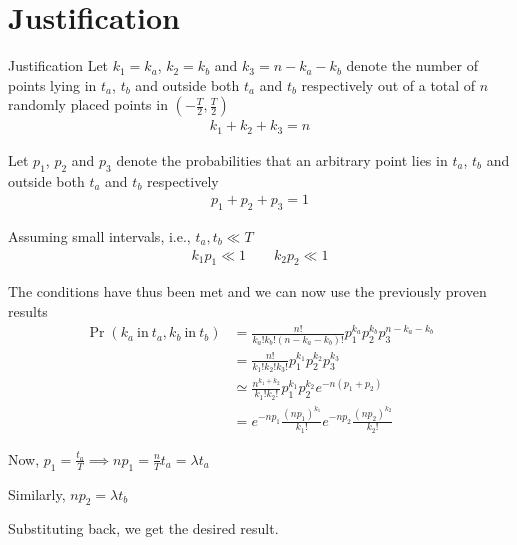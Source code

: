 \documentclass{beamer}
\providecommand{\pr}[1]{\ensuremath{\Pr\left(#1\right)}}
\providecommand{\brak}[1]{\ensuremath{\left(#1\right)}}
\begin{document}
	\section{Justification}
	\begin{frame}{Justification}
	Let $k_1 = k_a$, $k_2 = k_b$ and $k_3 = n - k_a - k_b$ denote the number of points lying in $t_a$, $t_b$ and outside both $t_a$ and $t_b$ respectively out of a total of $n$ randomly placed points in $\brak{-\frac{T}{2}, \frac{T}{2}}$
	\begin{align}
		k_1 + k_2 + k_3 = n
	\end{align}
	
	Let $p_1$, $p_2$ and $p_3$ denote the probabilities that an arbitrary point lies in $t_a$, $t_b$ and outside both $t_a$ and $t_b$ respectively
	\begin{align}
		p_1 + p_2 + p_3 = 1
	\end{align}
	
	Assuming small intervals, i.e., $t_a, t_b \ll T$
	\begin{align}
		k_1 p_1 \ll 1 \qquad k_2 p_2 \ll 1
	\end{align}
	\end{frame}		
	
	\begin{frame}
	The conditions have thus been met and we can now use the previously proven results
	\begin{align}
		\pr{k_a~\mathrm{in}~t_a, k_b~\mathrm{in}~t_b} &= \frac{n!}{k_a! k_b! (n-k_a-k_b)!} p_1^{k_a} p_2^{k_b} p_3^{n - k_a - k_b} \\
		&= \frac{n!}{k_1! k_2! k_3!} p_1^{k_1} p_2^{k_2} p_3^{k_3} \\
		&\simeq \frac{n^{k_1 + k_2}}{k_1! k_2!} p_1^{k_1} p_2^{k_2} e^{-n(p_1 + p_2)} \\
		&= e^{-np_1} \frac{(np_1)^{k_1}}{k_1!} e^{-np_2} \frac{(np_2)^{k_2}}{k_2!}
	\end{align}
	
	Now, $p_1 = \frac{t_a}{T} \implies np_1 = \frac{n}{T} t_a = \lambda t_a$
	
	Similarly, $np_2 = \lambda t_b$
	
	Substituting back, we get the desired result.
	\end{frame}
	
\end{document}
